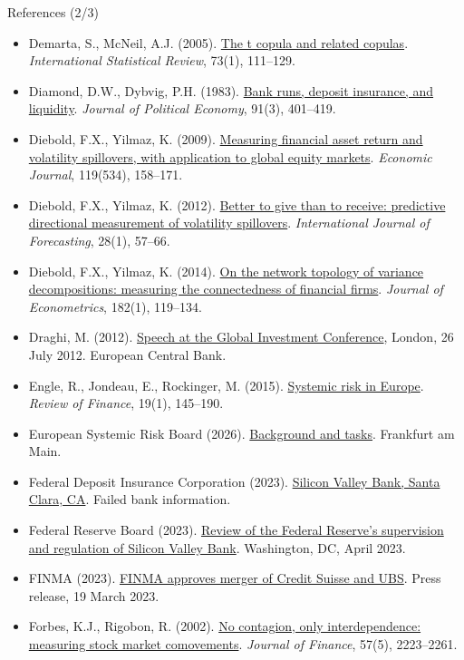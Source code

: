 \begin{frame}{References (2/3)}
\itemsize{\tiny}
\begin{itemize}
    \item Demarta, S., McNeil, A.J. (2005). \href{https://doi.org/10.1111/j.1751-5823.2005.tb00254.x}{The t copula and related copulas}. \textit{International Statistical Review}, 73(1), 111--129.
    \item Diamond, D.W., Dybvig, P.H. (1983). \href{https://doi.org/10.1086/261155}{Bank runs, deposit insurance, and liquidity}. \textit{Journal of Political Economy}, 91(3), 401--419.
    \item Diebold, F.X., Yilmaz, K. (2009). \href{https://doi.org/10.1111/j.1468-0297.2008.02208.x}{Measuring financial asset return and volatility spillovers, with application to global equity markets}. \textit{Economic Journal}, 119(534), 158--171.
    \item Diebold, F.X., Yilmaz, K. (2012). \href{https://doi.org/10.1016/j.ijforecast.2011.02.006}{Better to give than to receive: predictive directional measurement of volatility spillovers}. \textit{International Journal of Forecasting}, 28(1), 57--66.
    \item Diebold, F.X., Yilmaz, K. (2014). \href{https://doi.org/10.1016/j.jeconom.2014.04.012}{On the network topology of variance decompositions: measuring the connectedness of financial firms}. \textit{Journal of Econometrics}, 182(1), 119--134.
    \item Draghi, M. (2012). \href{https://www.ecb.europa.eu/press/key/date/2012/html/sp120726.en.html}{Speech at the Global Investment Conference}, London, 26 July 2012. European Central Bank.
    \item Engle, R., Jondeau, E., Rockinger, M. (2015). \href{https://doi.org/10.1093/rof/rfu012}{Systemic risk in Europe}. \textit{Review of Finance}, 19(1), 145--190.
    \item European Systemic Risk Board (2026). \href{https://www.esrb.europa.eu/about/background/html/index.en.html}{Background and tasks}. Frankfurt am Main.
    \item Federal Deposit Insurance Corporation (2023). \href{https://www.fdic.gov/resources/resolutions/bank-failures/failed-bank-list/silicon-valley.html}{Silicon Valley Bank, Santa Clara, CA}. Failed bank information.
    \item Federal Reserve Board (2023). \href{https://www.federalreserve.gov/publications/files/svb-review-20230428.pdf}{Review of the Federal Reserve's supervision and regulation of Silicon Valley Bank}. Washington, DC, April 2023.
    \item FINMA (2023). \href{https://www.finma.ch/en/news/2023/03/20230319-mm-cs-ubs/}{FINMA approves merger of Credit Suisse and UBS}. Press release, 19 March 2023.
    \item Forbes, K.J., Rigobon, R. (2002). \href{https://doi.org/10.1111/0022-1082.00494}{No contagion, only interdependence: measuring stock market comovements}. \textit{Journal of Finance}, 57(5), 2223--2261.
\end{itemize}
\end{frame}

